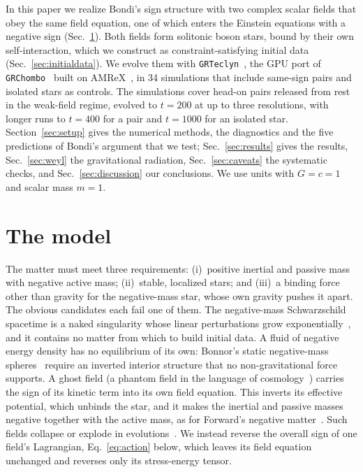 \documentclass[twocolumn,floatfix,aps,prd,superscriptaddress,nofootinbib]{revtex4-2}
\begin{document}
In this paper we realize Bondi's sign structure with two complex scalar fields that obey the same field equation, one of which enters the Einstein equations with a negative sign (Sec.~\ref{sec:model}). Both fields form solitonic boson stars, bound by their own self-interaction, which we construct as constraint-satisfying initial data (Sec.~\ref{sec:initialdata}). We evolve them with \texttt{GRTeclyn}~\cite{grteclyn}, the GPU port of \texttt{GRChombo}~\cite{grchombo} built on AMReX~\cite{amrex}, in 34 simulations that include same-sign pairs and isolated stars as controls. The simulations cover head-on pairs released from rest in the weak-field regime, evolved to $t=200$ at up to three resolutions, with longer runs to $t=400$ for a pair and $t=1000$ for an isolated star. Section~\ref{sec:setup} gives the numerical methods, the diagnostics and the five predictions of Bondi's argument that we test; Sec.~\ref{sec:results} gives the results, Sec.~\ref{sec:weyl} the gravitational radiation, Sec.~\ref{sec:caveats} the systematic checks, and Sec.~\ref{sec:discussion} our conclusions. We use units with $G=c=1$ and scalar mass $m=1$.

\section{The model}
\label{sec:model}

The matter must meet three requirements: (i)~positive inertial and passive mass with negative active mass; (ii)~stable, localized stars; and (iii)~a binding force other than gravity for the negative-mass star, whose own gravity pushes it apart. The obvious candidates each fail one of them. The negative-mass Schwarzschild spacetime is a naked singularity whose linear perturbations grow exponentially~\cite{gleiser2006}, and it contains no matter from which to build initial data. A fluid of negative energy density has no equilibrium of its own: Bonnor's static negative-mass spheres~\cite{bonnor1989} require an inverted interior structure that no non-gravitational force supports. A ghost field (a phantom field in the language of cosmology~\cite{caldwell2002}) carries the sign of its kinetic term into its own field equation. This inverts its effective potential, which unbinds the star, and it makes the inertial and passive masses negative together with the active mass, as for Forward's negative matter~\cite{forward1990}. Such fields collapse or explode in evolutions~\cite{shinkai2002,gonzalez2009,shirokov2026}. We instead reverse the overall sign of one field's Lagrangian, Eq.~\eqref{eq:action} below, which leaves its field equation unchanged and reverses only its stress-energy tensor.
\end{document}
